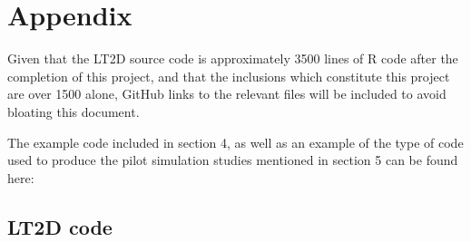 \documentclass[11pt]{article}
\begin{document}
\section{Appendix}

Given that the LT2D source code is approximately 3500 lines of R code after the completion of this project, and that the inclusions which constitute this project are over 1500 alone, GitHub links to the relevant files will be included to avoid bloating this document.


The example code included in section 4, as well as an example of the type of code used to produce the pilot simulation studies mentioned in section 5 can be found here: 




\subsection{LT2D code}
\end{document}

